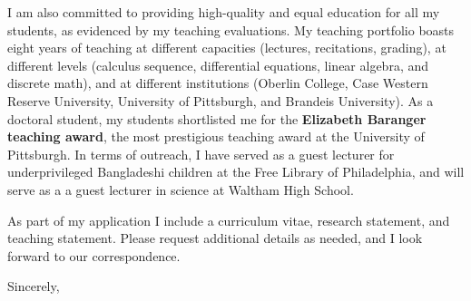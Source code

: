 \documentclass[11pt,a4paper]{letter}
\begin{document}
\begin{letter}
I am also committed to providing high-quality and equal education for all my students, as evidenced by my teaching evaluations. My teaching portfolio boasts eight years of teaching at different capacities (lectures, recitations, grading), at different levels (calculus sequence, differential equations, linear algebra, and discrete math), and at different institutions (Oberlin College, Case Western Reserve University, University of Pittsburgh, and Brandeis University). As a doctoral student, my students shortlisted me for the \textbf{Elizabeth Baranger teaching award}, the most prestigious teaching award at the University of Pittsburgh. In terms of outreach, I have served as a guest lecturer for underprivileged Bangladeshi children at the Free Library of Philadelphia, and will serve as a a guest lecturer in science at Waltham High School.


As part of my application I include a curriculum vitae, research statement, and teaching statement. Please request additional details as needed, and I look forward to our correspondence.

\closing{Sincerely,}
\end{letter}
\end{document}
